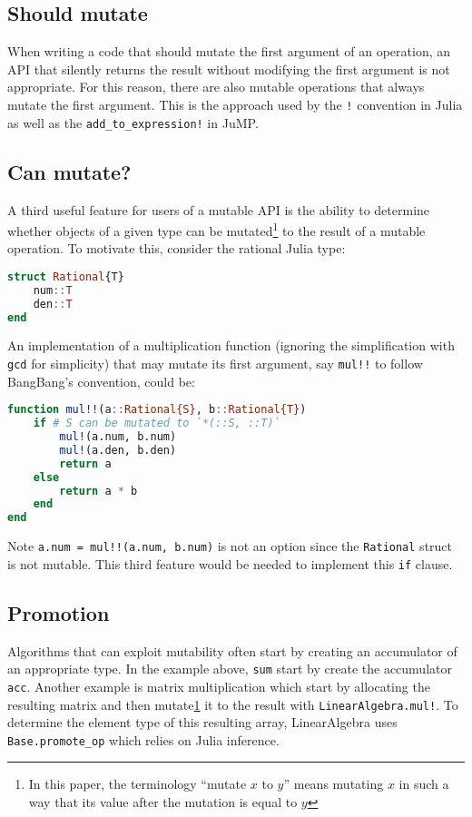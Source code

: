 \documentclass{juliacon}
\begin{document}
\subsection{Should mutate}
When writing a code that should mutate the first argument of an operation,
an API that silently returns the result without modifying the first argument is not appropriate.
For this reason, there are also mutable operations that always mutate the first argument.
This is the approach used by the \lstinline|!| convention in Julia
as well as the \lstinline|add_to_expression!| in JuMP.

\subsection{Can mutate?}
A third useful feature for users of a mutable API is the ability to
determine whether objects of a given type can be mutated\footnote{\label{foot:mutate}In this paper, the terminology ``mutate $x$ to $y$'' means mutating $x$ in such a way that its value after the mutation is equal to $y$} to the result of a mutable operation.
To motivate this, consider the rational Julia type:
\begin{lstlisting}[language = Julia]
struct Rational{T}
    num::T
    den::T
end
\end{lstlisting}
An implementation of a multiplication function (ignoring the simplification with \lstinline|gcd| for simplicity) that may
mutate its first argument, say \lstinline|mul!!| to follow BangBang's convention,
could be:
\begin{lstlisting}[language = Julia]
function mul!!(a::Rational{S}, b::Rational{T})
    if # S can be mutated to `*(::S, ::T)`
        mul!(a.num, b.num)
        mul!(a.den, b.den)
        return a
    else
        return a * b
    end
end
\end{lstlisting}
Note \lstinline|a.num = mul!!(a.num, b.num)| is not an option since
the \lstinline|Rational| struct is not mutable.
This third feature would be needed to implement this \lstinline|if| clause.

\subsection{Promotion}
Algorithms that can exploit mutability often start by creating an accumulator of
an appropriate type.
In the example above, \lstinline|sum| start by create the accumulator \lstinline|acc|.
Another example is matrix multiplication which start by allocating the resulting matrix and then mutate\cref{foot:mutate} it to the result with \lstinline|LinearAlgebra.mul!|.
To determine the element type of this resulting array,
LinearAlgebra uses \lstinline|Base.promote_op| which relies on Julia inference.
\end{document}
